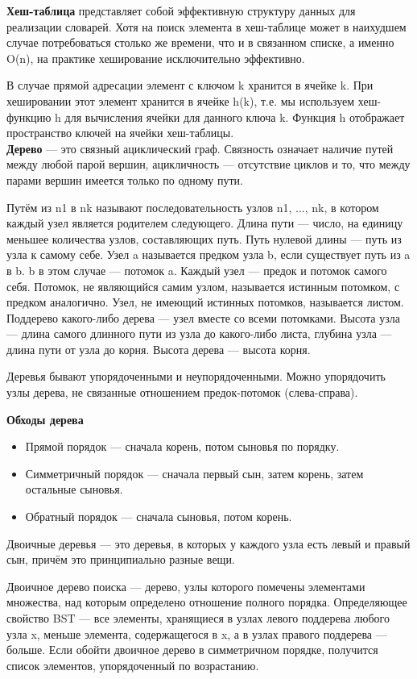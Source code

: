 \documentclass[12pt, a4paper]{article}
\begin{document}
\textbf{Хеш-таблица} представляет собой эффективную структуру данных для реализации словарей. Хотя на поиск элемента
в хеш-таблице может в наихудшем случае потребоваться столько же времени, что
и в связанном списке, а именно O(n), на практике хеширование исключительно
эффективно.

В случае прямой адресации элемент с ключом k хранится в ячейке k. При
хешировании этот элемент хранится в ячейке h(k), т.е. мы используем хеш-функцию h для вычисления ячейки для данного ключа k. Функция h отображает пространство ключей на ячейки хеш-таблицы.\\

\textbf{Дерево} — это связный ациклический граф. Связность означает наличие путей между любой парой вершин, ацикличность — отсутствие циклов и то, что между парами вершин имеется только по одному пути.

Путём из n1 в nk называют последовательность узлов n1, ..., nk, в котором каждый узел является родителем следующего. Длина пути — число, на единицу меньшее количества узлов, составляющих путь.
Путь нулевой длины — путь из узла к самому себе.
Узел a называется предком узла b, если существует путь из a в b. b в этом случае — потомок a. Каждый узел — предок и потомок самого себя. Потомок, не являющийся самим узлом, называется истинным потомком, с предком аналогично.
Узел, не имеющий истинных потомков, называется листом.
Поддерево какого-либо дерева — узел вместе со всеми потомками.
Высота узла — длина самого длинного пути из узла до какого-либо листа, глубина узла — длина пути от узла до корня. Высота дерева — высота корня.

Деревья бывают упорядоченными и неупорядоченными. Можно упорядочить узлы дерева, не связанные отношением предок-потомок (слева-справа).

\textbf{Обходы дерева}
\begin{itemize}
    \item Прямой порядок — сначала корень, потом сыновья по порядку.
    \item Симметричный порядок — сначала первый сын, затем корень, затем остальные сыновья.
    \item Обратный порядок — сначала сыновья, потом корень.
\end{itemize}

Двоичные деревья — это деревья, в которых у каждого узла есть левый и правый сын, причём это принципиально разные вещи.

Двоичное дерево поиска — дерево, узлы которого помечены элементами множества, над которым определено отношение полного порядка.
Определяющее свойство BST — все элементы, хранящиеся в узлах левого поддерева любого узла x, меньше элемента, содержащегося в x, а в узлах правого поддерева — больше.
Если обойти двоичное дерево в симметричном порядке, получится список элементов, упорядоченный по возрастанию.\\
\end{document}
